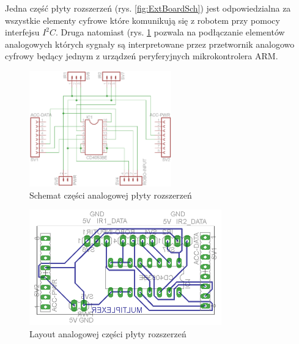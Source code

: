 Jedna część płyty rozszerzeń (rys. \ref{fig:ExtBoardSch}) jest odpowiedzialna za wszystkie elementy cyfrowe które komunikują się z robotem przy pomocy interfejsu $I^{2}C$. Druga natomiast (rys. \ref{fig:AdcMultiplexerSch} pozwala na podłączanie elementów analogowych których sygnały są interpretowane przez przetwornik analogowo cyfrowy będący jednym z urządzeń peryferyjnych mikrokontrolera ARM.

\begin{figure}[!ht]
 \centering
 \includegraphics[height=50mm]{../images/ch04/adcmultiplexer-sch.png}
 \caption{Schemat części analogowej płyty rozszerzeń}
 \label{fig:AdcMultiplexerSch}
\end{figure}

\begin{figure}[!ht]
 \centering
 \includegraphics[height=50mm]{../images/ch04/adcmultiplexer-brd.png}
 \caption{Layout analogowej części płyty rozszerzeń}
 \label{fig:AdcMultiplexerPCB}
\end{figure}